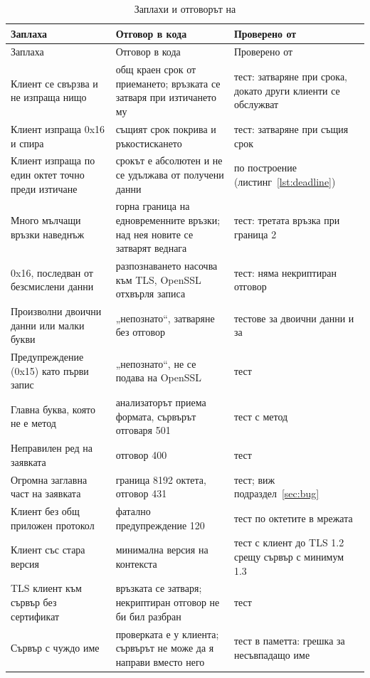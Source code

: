 \begin{longtable}{@{}L{4.6cm}L{5.8cm}L{5.4cm}@{}}
\caption{Заплахи и отговорът на }
\label{tab:threats}\\
\toprule
Заплаха & Отговор в кода & Проверено от \\
\midrule
\endfirsthead
\toprule
Заплаха & Отговор в кода & Проверено от \\
\midrule
\endhead
Клиент се свързва и не изпраща нищо & общ краен срок от приемането; връзката се
  затваря при изтичането му & тест: затваряне при срока, докато други клиенти се
  обслужват \\
Клиент изпраща 0x16 и спира & същият срок покрива и ръкостискането & тест: затваряне
  при същия срок \\
Клиент изпраща по един октет точно преди изтичане & срокът е абсолютен и не се
  удължава от получени данни & по построение (листинг~\ref{lst:deadline}) \\
Много мълчащи връзки наведнъж & горна граница на едновременните връзки; над нея новите
  се затварят веднага & тест: третата връзка при граница 2 \\
0x16, последван от безсмислени данни & разпознаването насочва към TLS, OpenSSL
  отхвърля записа & тест: няма некриптиран отговор \\
Произволни двоични данни или малки букви & „непознато“, затваряне без отговор & тестове
  за двоични данни и за  \\
Предупреждение (0x15) като първи запис & „непознато“, не се подава на OpenSSL & тест \\
Главна буква, която не е метод & анализаторът приема формата, сървърът отговаря 501
  \cite[раздел 15.6.2]{rfc9110} & тест с метод  \\
Неправилен ред на заявката & отговор 400 & тест \\
Огромна заглавна част на заявката & граница 8192 октета, отговор 431 \cite{rfc6585}
  & тест; виж подраздел~\ref{sec:bug} \\
Клиент без общ приложен протокол & фатално предупреждение 120 &
  тест по октетите в мрежата \\
Клиент със стара версия & минимална версия на контекста & тест с клиент до TLS 1.2
  срещу сървър с минимум 1.3 \\
TLS клиент към сървър без сертификат & връзката се затваря; некриптиран отговор
  не би бил разбран & тест \\
Сървър с чуждо име & проверката е у клиента; сървърът не може да я направи вместо него
  & тест в паметта: грешка за несъвпадащо име \\
\bottomrule
\end{longtable}


